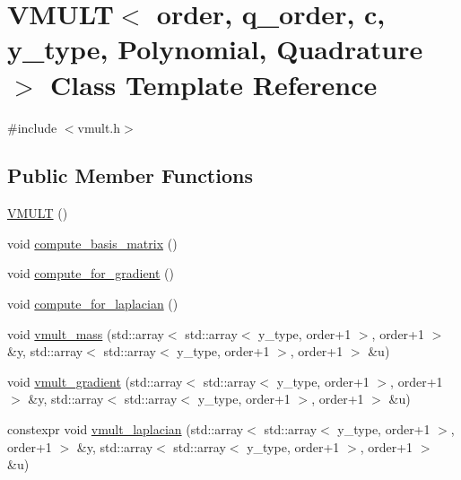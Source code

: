 \hypertarget{class_v_m_u_l_t}{}\section{V\+M\+U\+LT$<$ order, q\+\_\+order, c, y\+\_\+type, Polynomial, Quadrature $>$ Class Template Reference}
\label{class_v_m_u_l_t}


{\ttfamily \#include $<$vmult.\+h$>$}

\subsection*{Public Member Functions}
\begin{DoxyCompactItemize}
\item 
\hyperlink{class_v_m_u_l_t_a31d73a0a561c27c4443a167950a9c852}{V\+M\+U\+LT} ()
\item 
void \hyperlink{class_v_m_u_l_t_a0d60b90e214cf4e5d35e3b3c1402ccec}{compute\+\_\+basis\+\_\+matrix} ()
\item 
void \hyperlink{class_v_m_u_l_t_a51170ad231bce36f2be50c5198a2aec0}{compute\+\_\+for\+\_\+gradient} ()
\item 
void \hyperlink{class_v_m_u_l_t_add49b6c92921149a92830f2930074aab}{compute\+\_\+for\+\_\+laplacian} ()
\item 
void \hyperlink{class_v_m_u_l_t_ab903e1707daffaf5480c481281f419db}{vmult\+\_\+mass} (std\+::array$<$ std\+::array$<$ y\+\_\+type, order+1 $>$, order+1 $>$ \&y, std\+::array$<$ std\+::array$<$ y\+\_\+type, order+1 $>$, order+1 $>$ \&u)
\item 
void \hyperlink{class_v_m_u_l_t_a722ef0ecb53e27931993425f5514ea8a}{vmult\+\_\+gradient} (std\+::array$<$ std\+::array$<$ y\+\_\+type, order+1 $>$, order+1 $>$ \&y, std\+::array$<$ std\+::array$<$ y\+\_\+type, order+1 $>$, order+1 $>$ \&u)
\item 
constexpr void \hyperlink{class_v_m_u_l_t_a51c70b05d1f6d934470b1f11526cbc80}{vmult\+\_\+laplacian} (std\+::array$<$ std\+::array$<$ y\+\_\+type, order+1 $>$, order+1 $>$ \&y, std\+::array$<$ std\+::array$<$ y\+\_\+type, order+1 $>$, order+1 $>$ \&u)
\end{DoxyCompactItemize}
